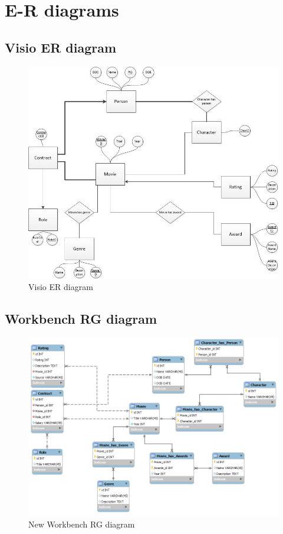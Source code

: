 \section{E-R diagrams}
\subsection{Visio ER diagram}
\begin{figure}[h!]
\includegraphics[width=\textwidth,natwidth=825,natheight=699]{illustrations/ER.jpg}
  \caption{Visio ER diagram}
\end{figure}
\subsection{Workbench RG diagram}
\begin{figure}[h!]
\includegraphics[width=\textwidth,natwidth=940,natheight=670]{illustrations/RG.png}
  \caption{New Workbench RG diagram}
\end{figure}
\newpage
